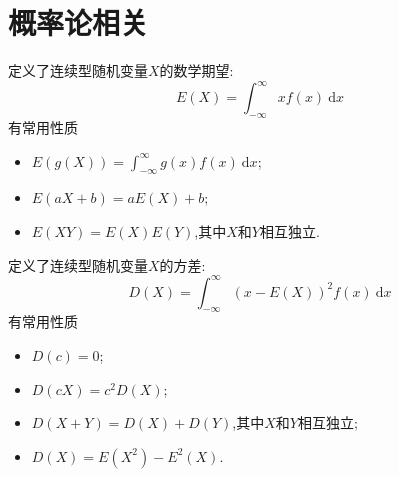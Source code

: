 \documentclass[cn,10pt,citestyle=gb7714-2015,bibstyle=gb7714-2015]{elegantbook}
\newcommand{\md}{\ \mathrm{d}}
\begin{document}
\section{概率论相关}
\begin{theorem}[连续型随机变量数学期望的性质]
  定义了连续型随机变量$X$的数学期望:
  \begin{equation}
    E(X)=\int_{-\infty}^\infty xf(x)\md x
  \end{equation}
  有常用性质
  \begin{itemize}
    \item $\displaystyle E(g(X))=\int_{-\infty}^\infty g(x)f(x)\md x$;
    \item $\displaystyle E(aX+b)=aE(X)+b$;
    \item $\displaystyle E(XY)=E(X)E(Y)$,其中$X$和$Y$相互独立.
  \end{itemize}
\end{theorem}
\begin{theorem}[连续型随机变量方差的性质]
  定义了连续型随机变量$X$的方差:
  \begin{equation}
    D(X)=\int_{-\infty}^\infty(x-E(X))^2f(x)\md x
  \end{equation}
  有常用性质
  \begin{itemize}
    \item $D(c)=0$;
    \item $D(cX)=c^2D(X)$;
    \item $D(X+Y)=D(X)+D(Y)$,其中$X$和$Y$相互独立;
    \item $D(X)=E(X^2)-E^2(X)$.
  \end{itemize}
\end{theorem}
\begin{table}[H]
  \begin{center}
    \caption{常见分布的数学期望与方差}
  \end{center}
\end{table}
\end{document}
